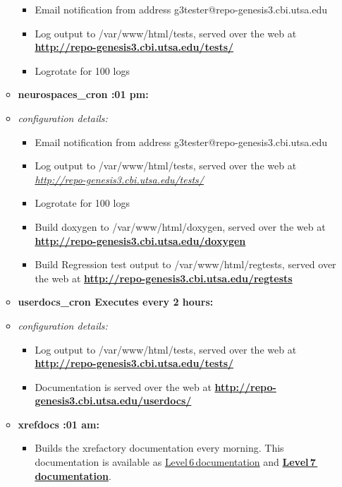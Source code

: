 \documentclass[12pt]{article}
\begin{document}
\begin{itemize}
\begin{itemize}
\begin{itemize}
	\item Email notification from address g3tester@repo-genesis3.cbi.utsa.edu
	\item Log output to /var/www/html/tests, served over the web at \href{http://repo-genesis3.cbi.utsa.edu/tests/}{\bf http://repo-genesis3.cbi.utsa.edu/tests/}
	\item Logrotate for 100 logs
\end{itemize}

\item[] {\bf neurospaces\_cron :01 pm:}
	\item {\it configuration details:} 
\begin{itemize}

	\item Email notification from address g3tester@repo-genesis3.cbi.utsa.edu
	\item Log output to /var/www/html/tests, served over the web at \href{http://repo-genesis3.cbi.utsa.edu/tests/}{\it http://repo-genesis3.cbi.utsa.edu/tests/}
	\item Logrotate for 100 logs
	\item Build doxygen to /var/www/html/doxygen, served over the web at \href{http://repo-genesis3.cbi.utsa.edu/doxygen}{\bf http://repo-genesis3.cbi.utsa.edu/doxygen}
	\item Build Regression test output to /var/www/html/regtests, served over the web at \href{http://repo-genesis3.cbi.utsa.edu/regtests}{\bf http://repo-genesis3.cbi.utsa.edu/regtests}
\end{itemize}

\item[] {\bf userdocs\_cron \- Executes every 2 hours:}
	\item {\it configuration details:} 
\begin{itemize}

	\item Log output to /var/www/html/tests, served over the web at \href{http://repo-genesis3.cbi.utsa.edu/tests/}{\bf http://repo-genesis3.cbi.utsa.edu/tests/}
	\item Documentation is served over the web at \href{http://repo-genesis3.cbi.utsa.edu/userdocs/}{\bf http://repo-genesis3.cbi.utsa.edu/userdocs/}
\end{itemize}

\item[] {\bf xrefdocs :01 am:}
\begin{itemize}
	\item Builds the xrefactory documentation every morning.  This documentation is available as \href{http://repo-genesis3.cbi.utsa.edu/doxygen/}{Level\,6\,documentation} and \href{http://repo-genesis3.cbi.utsa.edu/crossref/}{\bf Level\,7\,documentation}.
\end{itemize}
\end{itemize}

\end{itemize}
\end{document}
